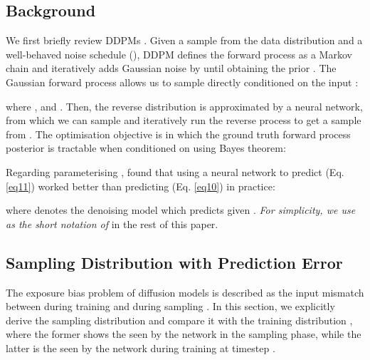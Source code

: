 \documentclass{article} \usepackage{iclr2024_conference,times}
\begin{document}
\subsection{Background}
We first briefly review DDPMs \citep{DDPM}. Given a sample  from the data distribution  
and a well-behaved noise schedule (), DDPM defines the forward process as a Markov chain  and iteratively adds Gaussian noise by  until obtaining the prior . The Gaussian forward process allows us to sample  directly conditioned on the input :


\noindent
where ,  and .
Then, the reverse distribution  is approximated by a neural network, from which we can sample  and iteratively run the reverse process  to get a sample from . The optimisation objective is  in which the ground truth forward process posterior  is tractable when conditioned on  using Bayes theorem:


\begin{figure}[ht]
\vskip -0.2in
    \begin{minipage}{0.59\linewidth}
        
    \end{minipage}
    \hfill
    \begin{minipage}{0.39\linewidth}
        
    \end{minipage}
\end{figure}


Regarding parameterising , \citet{DDPM} found that using a neural network to predict  (Eq. \ref{eq11}) worked better than predicting  (Eq. \ref{eq10}) in practice:


\noindent
where  denotes the denoising model which predicts  given . \textit{For simplicity, we use  as the short notation of } in the rest of this paper.



\subsection{Sampling Distribution with Prediction Error}
\label{sec: Sampling Distribution with Prediction Error}

The exposure bias problem of diffusion models is described as the input mismatch between  during training and  during sampling \citep{ning2023input}. In this section, we explicitly derive the sampling distribution  and compare it with the training distribution , where the former shows the  seen by the network in the sampling phase, while the latter is the  seen by the network during training at timestep .
\end{document}
